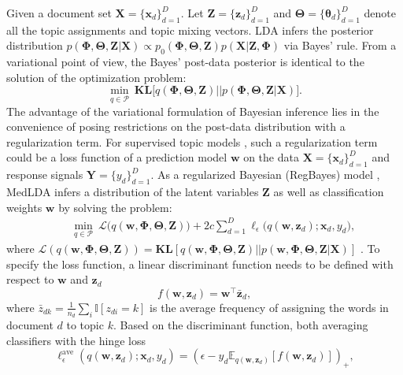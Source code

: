 \documentclass[twoside,11pt]{article}
\newcommand{\xv}{\bm{x}}
\newcommand{\Xv}{\bm{X}}
\newcommand{\Yv}{\bm{Y}}
\newcommand{\zv}{\bm{z}}
\newcommand{\Zv}{\bm{Z}}
\newcommand{\wv}{\bm{w}}
\newcommand{\Thetav}{\bm{\Theta}}
\newcommand{\Phiv}{\bm{\Phi}}
\newcommand{\KL}{\textbf{KL}}
\begin{document}
Given a document set $\Xv = \{\xv_d\}_{d=1}^D$. Let $\bm{Z} = \{\bm{z}_d\}_{d=1}^D$ and $\Thetav = \{\bm{\theta}_d\}_{d=1}^{D}$ denote all the topic assignments and topic mixing vectors. LDA infers the posterior distribution $p( \bm{\Phi}, \bm{\Theta}, \bm{Z} | \bm{X}) \propto p_0(\bm{\Phi}, \bm{\Theta}, \bm{Z}) p(\bm{X} | \bm{Z}, \bm{\Phi})$ via Bayes' rule. From a variational point of view, the Bayes' post-data posterior is identical to the solution of the optimization problem:
\begin{equation*}%
\min\limits_{q \in \mathcal{P}}~\KL\Big[ q(\Phiv, \Thetav, \Zv) || p(\Phiv, \Thetav, \Zv | \Xv) \Big]. %
\end{equation*}
The advantage of the variational formulation of Bayesian inference lies in the convenience of posing restrictions on the post-data distribution with a regularization term. For supervised topic models \citep{blei2010supervised,zhu2012medlda}, such a regularization term could be a loss function of a prediction model $\bm{w}$ on the data $\Xv = \{\xv_d\}_{d=1}^D$ and response signals $\Yv = \{y_d\}_{d=1}^D$. As a regularized Bayesian (RegBayes) model \citep{jiang2012monte}, MedLDA infers a distribution of the latent variables $\Zv$ as well as classification weights $\wv$ by solving the problem:
\setlength\arraycolsep{-2pt}\begin{eqnarray*}
&& \min\limits_{q \in \mathcal{P}}  ~\mathcal{L}\Big( q(\wv, \Phiv, \Thetav, \Zv) \Big) + 2c \sum\limits_{d=1}^{D}{\ell_{\epsilon}\Big( q(\wv, \zv_d); \xv_d, y_d \Big)},
\end{eqnarray*}
where \small $\mathcal{L}( q(\wv, \Phiv, \Thetav, \Zv) ) = \KL[q(\wv, \Phiv, \Thetav, \Zv) || p(\wv, \Phiv, \Thetav, \Zv | \Xv)]$ \normalsize. To specify the loss function, a linear discriminant function needs to be defined with respect to $\bm{w}$ and $\bm{z}_d$
%
\setlength\arraycolsep{1pt}\begin{equation}\label{eq:disc-func-latent}
f(\wv, \zv_d) = \wv^\top \bar{\zv}_d,
\end{equation}
%
where $\bar{z}_{dk} = \frac{1}{n_d} \sum_i{\mathbb{I}[z_{di} = k]}$ is the average frequency of assigning the words in document $d$ to topic $k$. Based on the discriminant function, both averaging classifiers with the hinge loss
\begin{equation} \label{eq:batch_bayes_loss}
\ell^\text{ave}_{\epsilon}(q(\wv, \zv_d); \xv_d, y_d) = \left( \epsilon - y_d \mathbb{E}_{q(\wv, \zv_d)}[f(\bm{w}, \bm{z}_d)] \right)_+,
\end{equation}
\end{document}
